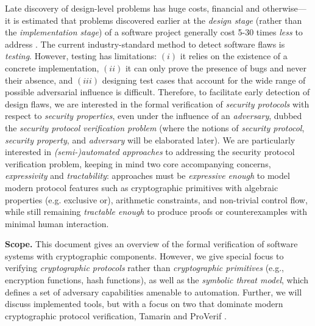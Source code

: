 \documentclass{article}
\theoremstyle{definition}
\begin{document}
Late discovery of design-level problems has huge costs, financial and otherwise---it is estimated 
that problems discovered earlier at the \textit{design stage} (rather than the \textit{implementation stage}) 
of a software project
generally cost 5-30 times \emph{less} to address \cite{fm}. 
The current industry-standard method to detect software flaws is \textit{testing}. 
However, testing has limitations: $(i)$ it relies on the existence of a concrete implementation, 
$(ii)$ it can only prove the presence of bugs and never their absence, 
and $(iii)$ designing test cases that account for the wide range of possible adversarial influence is difficult. 
Therefore, to facilitate early detection of design flaws, we are interested in the formal verification of 
\textit{security protocols} with respect to \textit{security properties}, 
even under the influence of an \textit{adversary}, 
dubbed the \textit{security protocol verification problem} 
(where the notions of \textit{security protocol}, \textit{security property}, and \textit{adversary} will be elaborated later). 
We are particularly interested in \emph{(semi-)automated approaches} to addressing the 
security protocol verification problem, keeping in mind two core accompanying concerns,
\emph{expressivity} and \emph{tractability}:
approaches must be \emph{expressive enough} to model modern protocol features such as cryptographic primitives with 
algebraic properties (e.g. exclusive or), arithmetic constraints, and non-trivial control flow, 
while still remaining \emph{tractable enough} to produce proofs or counterexamples with minimal human interaction. 

\textbf{Scope.} This document gives an overview of the formal verification of software systems with cryptographic components. 
However, we give special focus to verifying \emph{cryptographic protocols} rather than \emph{cryptographic primitives} 
(e.g., encryption functions, hash functions), as well as the \emph{symbolic threat model}, 
which defines a set of adversary capabilities amenable to automation. 
Further, we will discuss implemented tools, but with a focus on two that dominate modern 
cryptographic protocol verification, Tamarin \cite{tamarin} and ProVerif \cite{proverif}. 
\end{document}
